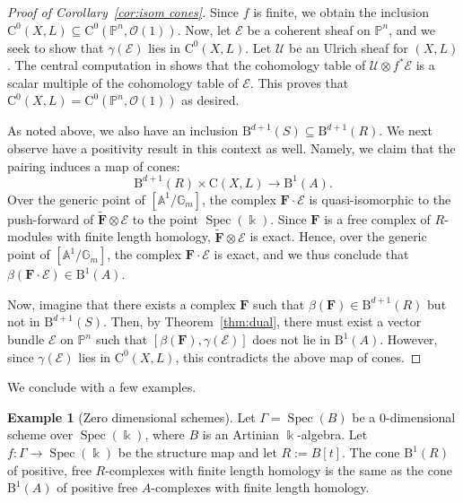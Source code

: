 \documentclass[12pt]{amsart}
\theoremstyle{definition}
\newtheorem{example}[lemma]{Example}
\theoremstyle{remark}
\newcommand{\Spec}{\operatorname{Spec}}
\newcommand{\kk}{\Bbbk}
\newcommand{\PP}{\mathbb{P}}
\renewcommand{\AA}{\mathbb{A}}
\newcommand{\GG}{\mathbb{G}}
\newcommand{\cO}{\mathcal{O}}
\newcommand{\cE}{\mathcal{E}}
\newcommand{\cU}{\mathcal{U}}
\newcommand{\FF}{\mathbf{F}}
\newcommand{\CQ}{\mathrm{C}}
\newcommand{\BBQ}{\mathrm{B}}
\begin{document}
\begin{proof}[Proof of Corollary~\ref{cor:isom cones}]
Since $f$ is finite, we obtain the inclusion $\CQ^0(X,L)\subseteq \CQ^0(\PP^n,\cO(1))$.  Now, let $\cE$ be a coherent sheaf on $\PP^n$, and we seek to show that $\gamma(\cE)$ lies in $\CQ^0(X,L)$.  Let $\cU$ be an Ulrich sheaf for $(X,L)$.  The central computation in \cite[Proof of Theorem 5]{eis-schrey-abel} shows that the cohomology table of $\cU\otimes f^*\cE$ is a scalar multiple of the cohomology table of $\cE$. This proves that $\CQ^0(X,L)= \CQ^0(\PP^n,\cO(1))$ as desired.

As noted above, we also have an inclusion $\BBQ^{d+1}(S)\subseteq \BBQ^{d+1}(R)$.  We next observe have a positivity result in this context as well.  Namely, we claim that the pairing induces a map of cones:
\[
\BBQ^{d+1}(R)\times \CQ(X,L)\to \BBQ^1(A).
\]
Over the generic point of $[\AA^1/\GG_m]$, the complex $\FF\cdot \cE$ is quasi-isomorphic to the push-forward of $\widetilde{\FF}\otimes \cE$ to the point $\Spec(\kk)$.  Since $\FF$ is a free complex of $R$-modules with finite length homology, $\widetilde{\FF}\otimes \cE$ is exact.  Hence, over the generic point of $[\AA^1/\GG_m]$, the complex $\FF\cdot \cE$ is exact, and we thus conclude that $\beta(\FF\cdot \cE)\in \BBQ^1(A)$.

Now, imagine that  there exists a complex $\FF$ such that $\beta(\FF)\in \BBQ^{d+1}(R)$ but not in $\BBQ^{d+1}(S)$.  Then, by Theorem~\ref{thm:dual}, there must exist a vector bundle $\cE$ on $\PP^n$ such that $[\beta(\FF),\gamma(\cE)]$ does not lie in $\BBQ^1(A)$.  However, since $\gamma(\cE)$ lies in $\CQ^0(X,L)$, this contradicts the above map of cones.
\end{proof}


We conclude with a few examples.

\begin{example}[Zero dimensional schemes]\label{ex:zero dim}Let $\Gamma=\Spec(B)$ be a $0$-dimensional scheme over $\Spec(\kk)$, where $B$ is an Artinian $\kk$-algebra.  Let $f\colon \Gamma\to \Spec(\kk)$ be the structure map and let $R:=B[t]$.  The cone $\BBQ^1(R)$ of positive, free $R$-complexes with finite length homology is the same as the cone $\BBQ^1(A)$ of positive free $A$-complexes with finite length homology.  
\end{example}
\end{document}
